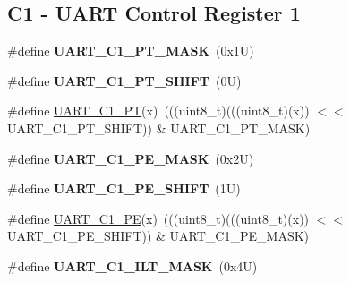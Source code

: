 \subsection*{C1 -\/ U\+A\+RT Control Register 1}
\begin{DoxyCompactItemize}
\item 
\mbox{\label{group___u_a_r_t___register___masks_ga5a1c05b549b94de9232fbac665b3f584}} 
\#define {\bfseries U\+A\+R\+T\+\_\+\+C1\+\_\+\+P\+T\+\_\+\+M\+A\+SK}~(0x1\+U)
\item 
\mbox{\label{group___u_a_r_t___register___masks_ga1638e7faa5063dab6afd34353fde4c89}} 
\#define {\bfseries U\+A\+R\+T\+\_\+\+C1\+\_\+\+P\+T\+\_\+\+S\+H\+I\+FT}~(0\+U)
\item 
\#define \mbox{\hyperlink{group___u_a_r_t___register___masks_gaf1c2f3c8a89397e4ccce509a2800250a}{U\+A\+R\+T\+\_\+\+C1\+\_\+\+PT}}(x)~(((uint8\+\_\+t)(((uint8\+\_\+t)(x)) $<$$<$ U\+A\+R\+T\+\_\+\+C1\+\_\+\+P\+T\+\_\+\+S\+H\+I\+FT)) \& U\+A\+R\+T\+\_\+\+C1\+\_\+\+P\+T\+\_\+\+M\+A\+SK)
\item 
\mbox{\label{group___u_a_r_t___register___masks_ga0204f696872c2e5f92413bb11d0170d1}} 
\#define {\bfseries U\+A\+R\+T\+\_\+\+C1\+\_\+\+P\+E\+\_\+\+M\+A\+SK}~(0x2\+U)
\item 
\mbox{\label{group___u_a_r_t___register___masks_ga1113f7bea6e6612fcc04db049d41cd1e}} 
\#define {\bfseries U\+A\+R\+T\+\_\+\+C1\+\_\+\+P\+E\+\_\+\+S\+H\+I\+FT}~(1\+U)
\item 
\#define \mbox{\hyperlink{group___u_a_r_t___register___masks_ga5aa3c8b737df2a5511d41513d4e4533f}{U\+A\+R\+T\+\_\+\+C1\+\_\+\+PE}}(x)~(((uint8\+\_\+t)(((uint8\+\_\+t)(x)) $<$$<$ U\+A\+R\+T\+\_\+\+C1\+\_\+\+P\+E\+\_\+\+S\+H\+I\+FT)) \& U\+A\+R\+T\+\_\+\+C1\+\_\+\+P\+E\+\_\+\+M\+A\+SK)
\item 
\mbox{\label{group___u_a_r_t___register___masks_ga52e0789bf5650788a4ecbed75cd2b3d3}} 
\#define {\bfseries U\+A\+R\+T\+\_\+\+C1\+\_\+\+I\+L\+T\+\_\+\+M\+A\+SK}~(0x4\+U)
\item 
\mbox{\label{group___u_a_r_t___register___masks_ga6066d98a54cf4ba19f40a196a0bd3ee0}} 

\end{DoxyCompactItemize}
